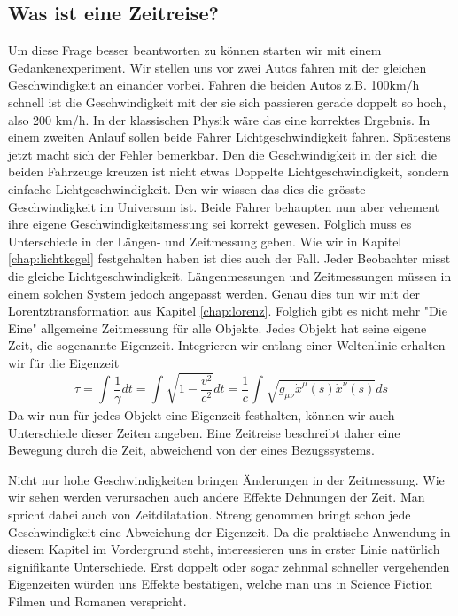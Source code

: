 \begin{refsection}
\section{Was ist eine Zeitreise?}
Um diese Frage besser beantworten zu können starten wir mit einem Gedankenexperiment. Wir stellen uns vor zwei Autos fahren mit der gleichen Geschwindigkeit an einander vorbei. Fahren die beiden Autos z.B. 100km/h schnell ist die Geschwindigkeit mit der sie sich passieren gerade doppelt so hoch, also 200 km/h. In der klassischen Physik wäre das eine korrektes Ergebnis. In einem zweiten Anlauf sollen beide Fahrer Lichtgeschwindigkeit fahren. Spätestens jetzt macht sich der Fehler bemerkbar. Den die Geschwindigkeit in der sich die beiden Fahrzeuge kreuzen ist nicht etwas Doppelte Lichtgeschwindigkeit, sondern einfache Lichtgeschwindigkeit. Den wir wissen das dies die grösste Geschwindigkeit im Universum ist.
Beide Fahrer behaupten nun aber vehement ihre eigene Geschwindigkeitsmessung sei korrekt gewesen. Folglich muss es Unterschiede in der Längen- und Zeitmessung geben.
Wie wir in Kapitel \ref{chap:lichtkegel} festgehalten haben ist dies auch der Fall. Jeder Beobachter misst die gleiche Lichtgeschwindigkeit. Längenmessungen und Zeitmessungen müssen in einem solchen System jedoch angepasst werden. Genau dies tun wir mit der Lorentztransformation aus Kapitel \ref{chap:lorenz}. Folglich gibt es nicht mehr "Die Eine" allgemeine Zeitmessung für alle Objekte. Jedes Objekt hat seine eigene Zeit, die sogenannte Eigenzeit.
Integrieren wir entlang einer Weltenlinie erhalten wir für die Eigenzeit
\begin{equation}\label{Eigenzeit}
\tau
=
\int_{}^{}\frac{1}{\gamma}dt=\int_{}^{}\sqrt{1-\frac{v^2}{c^2}}dt
=
\frac{1}{c}\int_{}^{}\sqrt{g_{\mu\nu}\dot{x}^{\mu}(s)\dot{x}^{\nu}(s)}ds
\end{equation}
Da wir nun für jedes Objekt eine Eigenzeit festhalten, können wir auch Unterschiede dieser Zeiten angeben.
Eine Zeitreise beschreibt daher eine Bewegung durch die Zeit, abweichend von der eines Bezugssystems. 

Nicht nur hohe Geschwindigkeiten bringen Änderungen in der Zeitmessung. Wie wir sehen werden verursachen auch andere Effekte Dehnungen der Zeit. Man spricht dabei auch von Zeitdilatation.
Streng genommen bringt schon jede Geschwindigkeit eine Abweichung der Eigenzeit. Da die praktische Anwendung in diesem Kapitel im Vordergrund steht, interessieren uns in erster Linie natürlich signifikante Unterschiede. Erst doppelt oder sogar zehnmal schneller vergehenden Eigenzeiten w\"urden uns Effekte best\"atigen, welche man uns in Science Fiction Filmen und Romanen verspricht.


\end{refsection}
